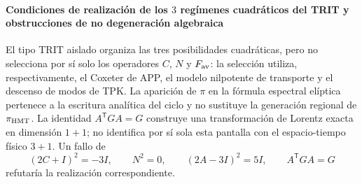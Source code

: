 \paragraph{Condiciones de realización de los \(3\) regímenes cuadráticos del TRIT y obstrucciones de no degeneración algebraica}
El tipo TRIT aislado organiza las tres posibilidades cuadráticas, pero no
selecciona por sí solo los operadores \(C\), \(N\) y \(F_{\rm av}\): la
selección utiliza, respectivamente, el Coxeter de APP, el modelo nilpotente
de transporte y el descenso de modos de TPK. La aparición de \(\pi\) en la
fórmula espectral elíptica pertenece a la escritura analítica del ciclo y
no sustituye la generación regional de \(\pi_{\rm HMT}\). La identidad
\(A^{\mathsf T}GA=G\) construye una transformación de Lorentz exacta en
dimensión \(1+1\); no identifica por sí sola esta pantalla con el
espacio-tiempo físico \(3+1\). Un fallo de
\[
(2C+I)^2=-3I,\qquad N^2=0,\qquad
(2A-3I)^2=5I,\qquad A^{\mathsf T}GA=G
\]
refutaría la realización correspondiente.
